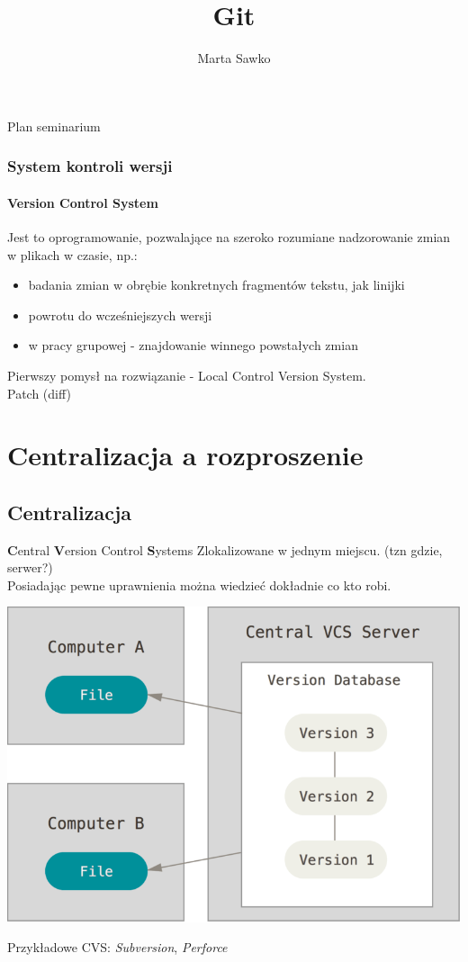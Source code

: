 \documentclass{beamer}
\title{Git}
\author{Marta Sawko}
\begin{document}
\frame{\titlepage}
\begin{frame}{Plan seminarium}
  \tableofcontents
\end{frame}

\begin{frame}
 \frametitle{System kontroli wersji}
 \framesubtitle{\textbf{V}ersion \textbf{C}ontrol \textbf{S}ystem}
 Jest to oprogramowanie, pozwalające na szeroko rozumiane nadzorowanie zmian w plikach w czasie, np.:
 \begin{itemize}
  \item badania zmian w obrębie konkretnych fragmentów tekstu, jak linijki
  \item powrotu do wcześniejszych wersji 
  \item w pracy grupowej - znajdowanie winnego powstałych zmian
 \end{itemize} 
 Pierwszy pomysł na rozwiązanie - Local Control Version System.\\
 Patch (diff)
\end{frame}

\section{Centralizacja a rozproszenie}
\subsection{Centralizacja}
\begin{frame}{\textbf{C}entral \textbf{V}ersion Control \textbf{S}ystems}
  Zlokalizowane w jednym miejscu. (tzn gdzie, serwer?) \\
  Posiadając pewne uprawnienia można wiedzieć dokładnie co kto robi.\\
  \begin{center}
   \includegraphics[height=0.4\textwidth]{./obrazki/fig-1_2.png}
 \end{center}
  Przykładowe CVS\@: \textit{Subversion}, \textit{Perforce}
\end{frame}
\end{document}

